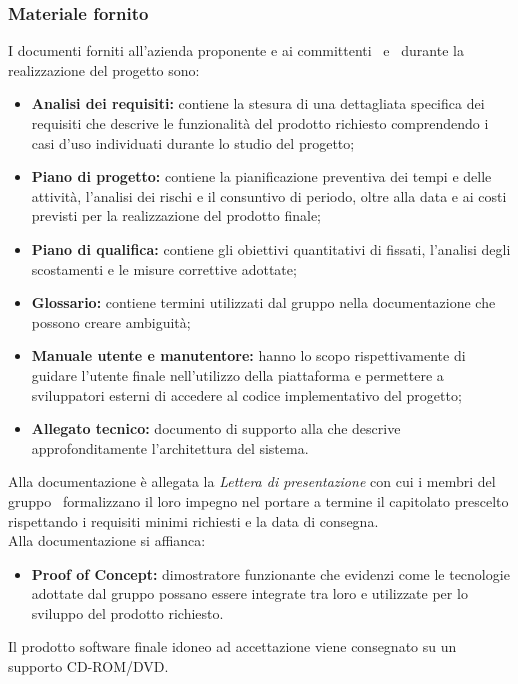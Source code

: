 \subsubsection{Materiale fornito}\label{MaterialeFornito} 
I documenti forniti all'azienda proponente e ai committenti \VT\ e \CR\ durante la realizzazione del progetto sono:
\begin{itemize}
	\item \textbf{Analisi dei requisiti:} contiene la stesura di una dettagliata specifica dei requisiti che descrive le funzionalità del prodotto richiesto comprendendo i casi d'uso individuati durante lo studio del progetto;
	\item \textbf{Piano di progetto:} contiene la pianificazione preventiva dei tempi e delle attività, l’analisi dei rischi e il consuntivo di periodo, oltre alla data e ai costi previsti per la realizzazione del prodotto finale;
	\item \textbf{Piano di qualifica:} contiene gli obiettivi quantitativi di  fissati, l'analisi degli scostamenti e le misure correttive adottate;
	\item \textbf{Glossario:} contiene termini utilizzati dal gruppo nella documentazione che possono creare ambiguità;
	\item \textbf{Manuale utente e manutentore:} hanno lo scopo rispettivamente di guidare l'utente finale nell'utilizzo della piattaforma e permettere a sviluppatori esterni di accedere al codice implementativo del progetto;
	\item \textbf{Allegato tecnico:} documento di supporto alla  che descrive approfonditamente l'architettura del sistema.
\end{itemize}
Alla documentazione è allegata la \textit{Lettera di presentazione} con cui i membri del gruppo \Gruppo\ formalizzano il loro impegno nel portare a termine il capitolato prescelto rispettando i requisiti minimi richiesti e la data di consegna.\\
Alla documentazione si affianca:
\begin{itemize}
	\item \textbf{Proof of Concept:} dimostratore funzionante che evidenzi come le tecnologie adottate dal gruppo possano essere integrate tra loro e utilizzate per lo sviluppo del prodotto richiesto.
\end{itemize}
Il prodotto software finale idoneo ad accettazione viene consegnato su un supporto CD-ROM/DVD.

